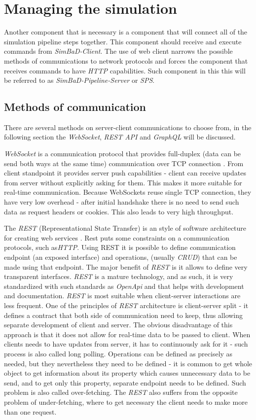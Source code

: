 \section{Managing the simulation}
Another component that is necessary is a component that will connect all of the simulation pipeline steps together. This component should receive and execute commands from \textit{SimBaD-Client}. The use of web client narrows the possible methods of communications to network protocols and forces the component that receives commands to have \textit{HTTP} capabilities. Such component in this this will be referred to as \textit{SimBaD-Pipeline-Server} or \textit{SPS}. 
\subsection{Methods of communication}
There are several methods on server-client communications to choose from, in the following section the \textit{WebSocket}, \textit{REST API} and \textit{GraphQL} will be discussed.

\textit{WebSocket} is a communication protocol that provides full-duplex (data can be send both ways at the same time) communication over TCP connection \cite{Melnikov2011}. From client standpoint it provides server push capabilities - client can receive updates from server without explicitly asking for them. This makes it more suitable for real-time communication. Because WebSockets reuse single TCP connection, they have very low overhead - after initial handshake there is no need to send such data as request headers or cookies. This also leads to very high throughput. 

The \textit{REST} (Representational State Transfer) is an style of software architecture for creating web services \cite{Fielding2014}. Rest puts some constraints on a communication protocols, such as\textit{HTTP}. Using REST it is possible to define communication endpoint (an exposed interface) and operations, (usually \textit{CRUD}) that can be made using that endpoint. The major benefit of \textit{REST} is it allows to define very transparent interfaces. \textit{REST} is a mature technology, and as such, it is very standardized with such standards as \textit{OpenApi} and that helps with development and documentation. \textit{REST} is most suitable when client-server interactions are less frequent. One of the principles of \textit{REST} architecture is client-server split - it defines a contract that both side of communication need to keep, thus allowing separate development of client and server. The obvious disadvantage of this approach is that it does not allow for real-time data to be passed to client. When clients needs to have updates from server, it has to continuously ask for it - such process is also called long polling. Operations can be defined as precisely as needed, but they nevertheless they need to be defined - it is common to get whole object to get information about its property which causes unnecessary data to be send, and to get only this property, separate endpoint needs to be defined. Such problem is also called over-fetching. The \textit{REST} also suffers from the opposite problem of under-fetching, where to get necessary the client needs to make more than one request.

